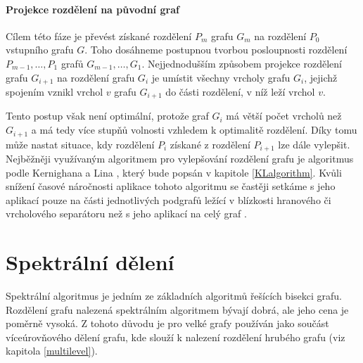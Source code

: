\documentclass[11pt,american,czech,oneside]{book}
\theoremstyle{plain}
\theoremstyle{definition}
\begin{document}
\paragraph{Projekce rozdělení na původní graf}
Cílem této fáze je převést získané rozdělení $P_m$ grafu $G_m$ na rozdělení $P_0$ vstupního grafu $G$. Toho dosáhneme postupnou tvorbou posloupnosti rozdělení $P_{m-1}, \ldots, P_1$ grafů $G_{m-1}, \ldots, G_1$. Nejjednodušším způsobem projekce rozdělení grafu $G_{i+1}$ na rozdělení grafu $G_i$ je umístit všechny vrcholy grafu $G_i$, jejichž spojením vznikl vrchol $v$ grafu $G_{i+1}$ do části rozdělení, v níž leží vrchol $v$.

Tento postup však není optimální, protože graf $G_i$ má větší počet vrcholů než $G_{i+1}$ a má tedy více stupňů volnosti vzhledem k optimalitě rozdělení. Díky tomu může nastat situace, kdy rozdělení $P_i$ získané z rozdělení $P_{i+1}$ lze dále vylepšit. Nejběžněji využívaným algoritmem pro vylepšování rozdělení grafu je algoritmus podle Kernighana a Lina \cite{keli:70}, který bude popsán v kapitole \ref{KLalgorithm}. Kvůli snížení časové náročnosti aplikace tohoto algoritmu se častěji setkáme s jeho aplikací pouze na části jednotlivých podgrafů ležící v blízkosti hranového či vrcholového separátoru než s jeho aplikací na celý graf \cite{kaku:98}.

\section{Spektrální dělení}
\label{spektral}

Spektrální algoritmus je jedním ze základních algoritmů řešících bisekci grafu. Rozdělení grafu nalezená spektrálním algoritmem bývají dobrá, ale jeho cena je poměrně vysoká. Z tohoto důvodu je pro velké grafy používán jako součást víceúrovňového dělení grafu, kde slouží k nalezení rozdělení hrubého grafu (viz kapitola \ref{multilevel}).
\end{document}
